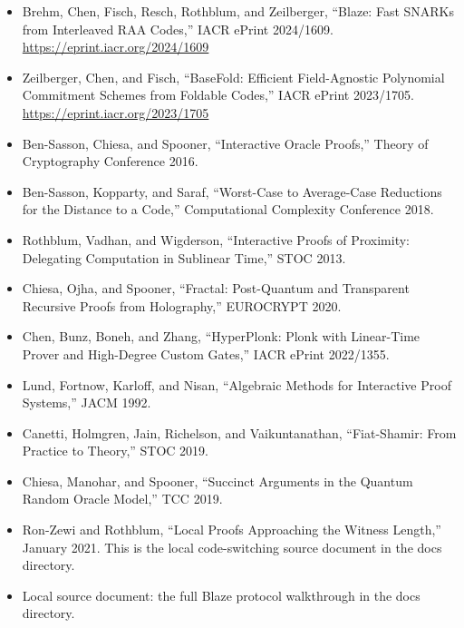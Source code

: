 \begin{itemize}
  \item[\textbf{[Blaze24]}] Brehm, Chen, Fisch, Resch, Rothblum, and Zeilberger,
        ``Blaze: Fast SNARKs from Interleaved RAA Codes,''
        IACR ePrint 2024/1609.
        \url{https://eprint.iacr.org/2024/1609}
  \item[\textbf{[BaseFold23]}] Zeilberger, Chen, and Fisch,
        ``BaseFold: Efficient Field-Agnostic Polynomial Commitment Schemes from
        Foldable Codes,'' IACR ePrint 2023/1705.
        \url{https://eprint.iacr.org/2023/1705}
  \item[\textbf{[BCS16]}] Ben-Sasson, Chiesa, and Spooner,
        ``Interactive Oracle Proofs,''
        Theory of Cryptography Conference 2016.
  \item[\textbf{[BKS18]}] Ben-Sasson, Kopparty, and Saraf,
        ``Worst-Case to Average-Case Reductions for the Distance to a Code,''
        Computational Complexity Conference 2018.
  \item[\textbf{[RVW13]}] Rothblum, Vadhan, and Wigderson,
        ``Interactive Proofs of Proximity: Delegating Computation in
        Sublinear Time,'' STOC 2013.
  \item[\textbf{[COS20]}] Chiesa, Ojha, and Spooner,
        ``Fractal: Post-Quantum and Transparent Recursive Proofs from
        Holography,'' EUROCRYPT 2020.
  \item[\textbf{[CBBZ23]}] Chen, Bunz, Boneh, and Zhang,
        ``HyperPlonk: Plonk with Linear-Time Prover and High-Degree Custom
        Gates,'' IACR ePrint 2022/1355.
  \item[\textbf{[LFKN92]}] Lund, Fortnow, Karloff, and Nisan,
        ``Algebraic Methods for Interactive Proof Systems,'' JACM 1992.
  \item[\textbf{[CCH19]}] Canetti, Holmgren, Jain, Richelson, and Vaikuntanathan,
        ``Fiat-Shamir: From Practice to Theory,'' STOC 2019.
  \item[\textbf{[CMS19]}] Chiesa, Manohar, and Spooner,
        ``Succinct Arguments in the Quantum Random Oracle Model,''
        TCC 2019.
  \item[\textbf{[RZR21]}] Ron-Zewi and Rothblum,
        ``Local Proofs Approaching the Witness Length,'' January 2021.
        This is the local code-switching source document in the docs
        directory.
  \item[\textbf{[Walkthrough]}] Local source document:
        the full Blaze protocol walkthrough in the docs directory.
\end{itemize}
